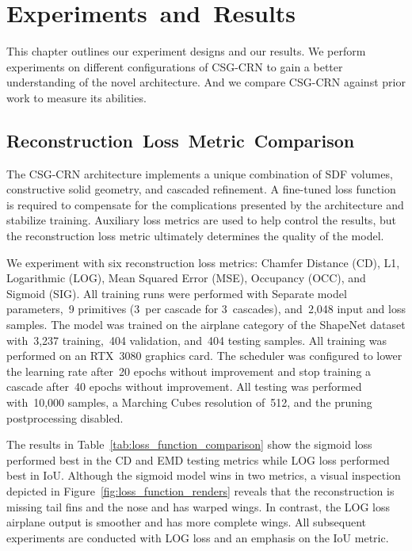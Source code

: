 
\chapter{Experiments~and~Results}
\label{chap:experiments_and_results}

This chapter outlines our experiment designs and our results. We perform experiments on different configurations of CSG-CRN to gain a better understanding of the novel architecture. And we compare CSG-CRN against prior work to measure its abilities.

\section{Reconstruction~Loss~Metric~Comparison}
\label{sec:reconstruction_loss_comparison}

The CSG-CRN architecture implements a unique combination of SDF volumes, constructive solid geometry, and cascaded refinement. A fine-tuned loss function is required to compensate for the complications presented by the architecture and stabilize training. Auxiliary loss metrics are used to help control the results, but the reconstruction loss metric ultimately determines the quality of the model.

We experiment with six reconstruction loss metrics: Chamfer Distance (CD), L1, Logarithmic (LOG), Mean Squared Error (MSE), Occupancy (OCC), and Sigmoid (SIG).  All training runs were performed with Separate model parameters,~9 primitives (3~per cascade for 3~cascades), and~2,048 input and loss samples. The model was trained on the airplane category of the ShapeNet dataset with~3,237 training,~404 validation, and~404 testing samples. All training was performed on an RTX~3080 graphics card. The scheduler was configured to lower the learning rate after~20 epochs without improvement and stop training a cascade after~40 epochs without improvement. All testing was performed with~10,000 samples, a Marching Cubes resolution of~512, and the pruning postprocessing disabled.

The results in Table~\ref{tab:loss_function_comparison} show the sigmoid loss performed best in the CD and EMD testing metrics while LOG loss performed best in IoU. Although the sigmoid model wins in two metrics, a visual inspection depicted in Figure~\ref{fig:loss_function_renders} reveals that the reconstruction is missing tail fins and the nose and has warped wings. In contrast, the LOG loss airplane output is smoother and has more complete wings. All subsequent experiments are conducted with LOG loss and an emphasis on the IoU metric.



